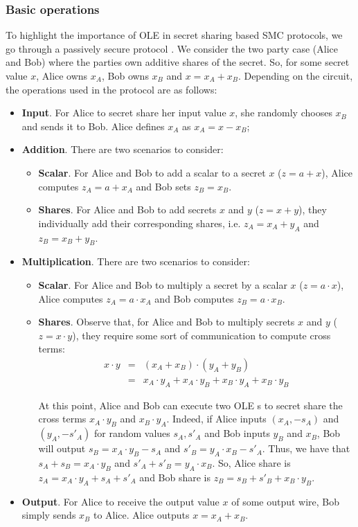 \subsubsection{Basic operations}

To highlight the importance of OLE in secret sharing based SMC protocols, we go through a passively secure protocol \cite{Evans2018}. We consider the two party case (Alice and Bob) where the parties own additive shares of the secret. So, for some secret value $x$, Alice owns $x_A$, Bob owns $x_B$ and $x = x_A + x_B$. Depending on the circuit, the operations used in the protocol are as follows:

\begin{itemize}
	\item \textbf{Input}. For Alice to secret share her input value $x$, she randomly chooses $x_B$ and sends it to Bob. Alice defines $x_A$ as $x_A = x - x_B$;
	\item \textbf{Addition}. There are two scenarios to consider:
	\begin{itemize}
		\item \textbf{Scalar}. For Alice and Bob to add a scalar to a secret $x$ ($z = a + x$), Alice computes $z_A = a + x_A$ and Bob sets $z_B = x_B$.
		\item \textbf{Shares}. For Alice and Bob to add secrets $x$ and $y$ ($z = x+y$), they individually add their corresponding shares, i.e. $z_A = x_A + y_A$ and $z_B = x_B + y_B$.
	\end{itemize}
	\item \textbf{Multiplication}. There are two scenarios to consider:
		\begin{itemize}
		\item \textbf{Scalar}. For Alice and Bob to multiply a secret by a scalar $x$ ($z = a \cdot x$), Alice computes $z_A = a \cdot x_A$ and Bob computes $z_B = a \cdot x_B$.
		\item \textbf{Shares}. Observe that, for Alice and Bob to multiply secrets $x$ and $y$ ($z = x\cdot y$), they require some sort of communication to compute cross terms:
		\begin{eqnarray}
		x\cdot y &=& (x_A + x_B)\cdot (y_A + y_B)\\
		&=& x_A\cdot y_A + x_A\cdot y_B + x_B \cdot y_A + x_B\cdot y_B
		\end{eqnarray}
		
		At this point, Alice and Bob can execute two OLE s to secret share the cross terms $x_A\cdot y_B$ and $x_B \cdot y_A$. Indeed, if Alice inputs $(x_A, - s_A)$ and $(y_A, - s'_A)$ for random values $s_A, s'_A$ and Bob inputs $y_B$ and $x_B$, Bob will output $s_B = x_A \cdot y_B - s_A$ and $s'_B = y_A \cdot x_B - s'_A$. Thus, we have that $s_A + s_B = x_A \cdot y_B$ and $s'_A + s'_B = y_A \cdot x_B$. So, Alice share is $z_A = x_A\cdot y_A + s_A + s'_A$ and Bob share is $z_B =  s_B + s'_B + x_B\cdot y_B$.  
	\end{itemize}
	\item \textbf{Output}. For Alice to receive the output value $x$ of some output wire, Bob simply sends $x_B$ to Alice. Alice outputs $x = x_A + x_B$.
\end{itemize}


